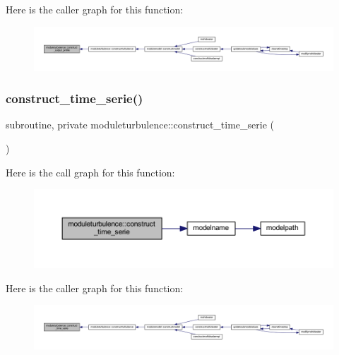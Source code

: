 Here is the caller graph for this function\+:\nopagebreak
\begin{figure}[H]
\begin{center}
\leavevmode
\includegraphics[width=350pt]{namespacemoduleturbulence_a4e5f190dd7da54cb916c8956e331e54c_icgraph}
\end{center}
\end{figure}
\mbox{\label{namespacemoduleturbulence_abb6ebc59b95b0d9ec2ec468d7ab4b43a}} 
\subsubsection{\texorpdfstring{construct\+\_\+time\+\_\+serie()}{construct\_time\_serie()}}
{\footnotesize\ttfamily subroutine, private moduleturbulence\+::construct\+\_\+time\+\_\+serie (\begin{DoxyParamCaption}{ }\end{DoxyParamCaption})\hspace{0.3cm}{\ttfamily [private]}}

Here is the call graph for this function\+:\nopagebreak
\begin{figure}[H]
\begin{center}
\leavevmode
\includegraphics[width=350pt]{namespacemoduleturbulence_abb6ebc59b95b0d9ec2ec468d7ab4b43a_cgraph}
\end{center}
\end{figure}
Here is the caller graph for this function\+:\nopagebreak
\begin{figure}[H]
\begin{center}
\leavevmode
\includegraphics[width=350pt]{namespacemoduleturbulence_abb6ebc59b95b0d9ec2ec468d7ab4b43a_icgraph}
\end{center}
\end{figure}
\mbox{\label{namespacemoduleturbulence_a5e493c3242c2ad7a0f5df2178a37aa3b}} 
